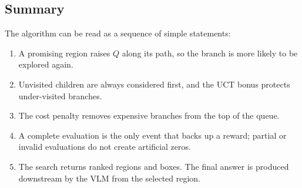 \subsection{Summary}

The algorithm can be read as a sequence of simple statements:
\begin{enumerate}
  \item A promising region raises \(Q\) along its path, so the branch is more
        likely to be explored again.
  \item Unvisited children are always considered first, and the UCT bonus
        protects under-visited branches.
  \item The cost penalty removes expensive branches from the top of the queue.
  \item A complete evaluation is the only event that backs up a reward; partial
        or invalid evaluations do not create artificial zeros.
  \item The search returns ranked regions and boxes. The final answer is produced
        downstream by the VLM from the selected region.
\end{enumerate}

